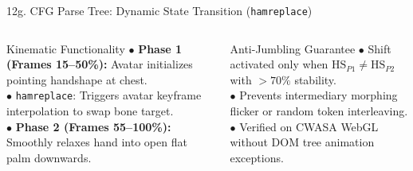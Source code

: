 \documentclass[aspectratio=169]{beamer}
\begin{document}
\begin{frame}[t]{12g. CFG Parse Tree: Dynamic State Transition (\texttt{hamreplace})}
\vspace{0.8mm}

\vspace{1.2mm}
\begin{columns}[T]
    \begin{block}{Kinematic Functionality}
        \fontsize{5.4pt}{6.8pt}\selectfont
        $\bullet$ \textbf{Phase 1 (Frames 15--50\%):} Avatar initializes pointing handshape at chest.\\
        $\bullet$ \texttt{hamreplace}: Triggers avatar keyframe interpolation to swap bone target.\\
        $\bullet$ \textbf{Phase 2 (Frames 55--100\%):} Smoothly relaxes hand into open flat palm downwards.
    \end{block}

    \begin{block}{Anti-Jumbling Guarantee}
        \fontsize{5.4pt}{6.8pt}\selectfont
        $\bullet$ Shift activated only when $\text{HS}_{P1} \neq \text{HS}_{P2}$ with $>70\%$ stability.\\
        $\bullet$ Prevents intermediary morphing flicker or random token interleaving.\\
        $\bullet$ Verified on CWASA WebGL without DOM tree animation exceptions.
    \end{block}
\end{columns}
\end{frame}
\end{document}
